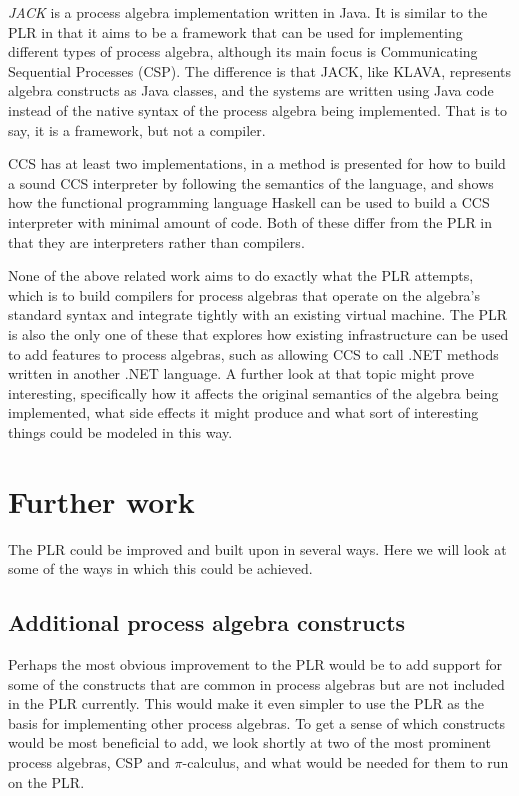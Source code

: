 	\textit{JACK} \cite{jack} is a process algebra implementation written in 
	Java. It is similar to the PLR in that it aims to be a framework that can be
	used for implementing different types of process algebra, although its main
	focus is Communicating Sequential Processes (CSP). The difference is that 
	JACK, like KLAVA, represents algebra constructs as Java classes, and the  
	systems are written using Java code instead of the native syntax of the 
	process algebra being implemented. That is to say, it is a framework, but 
	not a compiler.
	
	CCS has at least two implementations, in \cite{build_ccs_interpreter} a 
	method is presented for how to build a sound CCS interpreter by following 
	the semantics of the language, and \cite{ccs_interpreter} shows how the 
	functional programming language Haskell can be used to build a CCS 
	interpreter with minimal amount of code. Both of these differ from the PLR 
	in that they are interpreters rather than compilers.
	
	None of the above related work aims to do exactly what the PLR attempts, 
	which is to build compilers for process algebras that operate on the 		
	algebra's standard syntax and integrate tightly with an existing virtual 
	machine. The PLR is also the only one of these that explores how existing 
	infrastructure can be used to add features to process algebras, such as 
	allowing CCS to call .NET methods written in another .NET language. A 
	further look at that topic might prove interesting, specifically how it 
	affects the original semantics of the algebra being implemented, what side 
	effects it might produce and what sort of interesting things could be
	modeled in this way.

\section{Further work}
\label{sec:further}

	The PLR could be improved and built upon in several ways. Here we will look 
	at some of the ways in which this could be achieved.
	
	\subsection{Additional process algebra constructs}
	
	Perhaps the most obvious improvement to the PLR would be to add support for 
	some of the constructs that are common in process algebras but are not 
	included in the PLR currently. This would make it even simpler to use the 
	PLR as the basis for implementing other process algebras. To get a sense of 
	which constructs would be most beneficial to add, we look shortly at two
	of the most prominent process algebras, CSP and $\pi$-calculus, and 
	what would be needed for them to run on the PLR.
	
